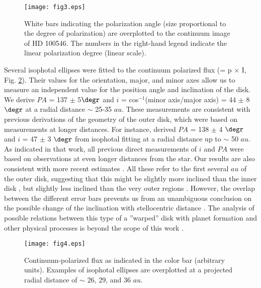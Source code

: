 \documentclass{aa}
\begin{document}
\begin{figure}
\centering
 \texttt{[image: fig3.eps]}
\caption{White bars indicating the polarization angle (size proportional to the degree of polarization) are overplotted to the continuum image of HD 100546. The numbers in the right-hand legend indicate the linear polarization degree (linear scale).}
\label{Figure:pol_map}
\end{figure} 

Several isophotal ellipses were fitted to the continuum polarized flux (= p $\times$ I, Fig. \ref{Figure:ellipses}). Their values for the orientation, major, and minor axes allow us to measure an independent value for the position angle and inclination of the disk. We derive $PA$ = 137 $\pm$ 5$\degr$ and $i$ = cos$^{-1}$(minor axis/major axis) = 44 $\pm$ 8$\degr$ at a radial distance $\sim$ 25-35 $au$. These measurements are consistent with previous derivations of the geometry of the outer disk, which were based on measurements at longer distances. For instance, \citet{Quanz11} derived $PA$ = 138 $\pm$ 4 $\degr$ and $i$ = 47 $\pm$ 3 $\degr$ from isophotal fitting at a radial distance up to $\sim$ 50 $au$. As indicated in that work, all previous direct measurements of $i$ and $PA$ were based on observations at even longer distances from the star. Our results are also consistent with more recent estimates \citep[e.g.,][]{Avenhaus14,Panic14}. All these refer to the first
several $au$ of the outer disk, suggesting that this might be slightly more inclined than the inner disk \citep[$i$ = 33 $\pm$ 11 $\degr$ at a radial distance $\sim$ 0.25 $au;$][]{Tatulli11}, but slightly less inclined than the very outer regions \citep[$i$ $\sim$ 50 $\degr$ at a radial distance $>$ 200 au][]{Quillen06,Panic10,Pineda14}. However, the overlap between the different error bars prevents us from an unambiguous conclusion on the possible change of the inclination with stellocentric distance \citep[see also the recently accepted paper][]{Walsh17}. The analysis of possible relations between this type of a ''warped'' disk with planet formation and other physical processes is beyond the scope of this work \citep[see, e.g., the recent review on the topic in][]{Casassus16}.

\begin{figure}
\centering
 \texttt{[image: fig4.eps]}
\caption{Continuum-polarized flux as indicated in the color bar (arbitrary units). Examples of isophotal ellipses are overplotted at a projected radial distance of $\sim$ 26, 29, and 36 $au$.}
\label{Figure:ellipses}
\end{figure} 
\end{document}
